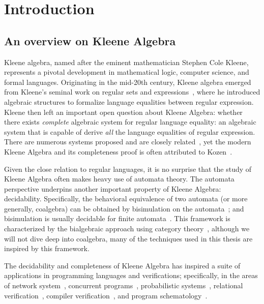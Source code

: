 \chapter{Introduction}
\label{chapter:introduction}
\thispagestyle{myheadings}

\section{An overview on Kleene Algebra}
\label{sec:history}

Kleene algebra, named after the eminent mathematician Stephen Cole Kleene, represents a pivotal development in mathematical logic, computer science, and formal languages. 
Originating in the mid-20th century, Kleene algebra emerged from Kleene's seminal work on regular sets and expressions~\cite{Kleene_1956}, where he introduced algebraic structures to formalize language equalities between regular expression. 
Kleene then left an important open question about Kleene Algebra: whether there exists \emph{complete} algebraic system for regular language equality: an algebraic system that is capable of derive \emph{all} the language equalities of regular expression.
There are numerous systems proposed and are closely related~\cite{Kozen_1990}, yet the modern Kleene Algebra and its completeness proof is often attributed to Kozen~\cite{Kozen_2001,Kozen_1994}.

Given the close relation to regular languages, it is no surprise that the study of Kleene Algebra often makes heavy use of automata theory.
The automata perspective underpins another important property of Kleene Algebra: decidability.
Specifically, the behavioral equivalence of two automata (or more generally, coalgebra) can be obtained by bisimulation on the automata~\cite{rutten_UniversalCoalgebraTheory_2000}; and bisimulation is usually decidable for finite automata~\cite{Kozen_2008,Smolka_Foster_Hsu_Kappé_Kozen_Silva_2020,Silva_2010}.
This framework is characterized by the bialgebraic approach using category theory~\cite{jacobs_BialgebraicReviewDeterministic_2006}, although we will not dive deep into coalgebra, many of the techniques used in this thesis are inspired by this framework.

The decidability and completeness of Kleene Algebra has inspired a suite of applications in programming languages and verifications; specifically, in the areas of network system~\cite{Anderson_Foster_Guha_Jeannin_Kozen_Schlesinger_Walker_2014,Foster_Kozen_Milano_Silva_Thompson_2015, Smolka_Kumar_Kahn_Foster_Hsu_Kozen_Silva_2019},
concurrent programs~\cite{hoare_ConcurrentKleeneAlgebra_2009,Kappé_Brunet_Silva_Wagemaker_Zanasi_2020,Kappé_Brunet_Silva_Zanasi_2018}, 
probabilistic systems~\cite{mciver_UsingProbabilisticKleene_2006, McIver_Rabehaja_Struth_2011}, 
relational verification~\cite{Antonopoulos_Koskinen_Le_Nagasamudram_Naumann_Ngo_2022},
compiler verification~\cite{Kozen_Patron_2000},
and program schematology~\cite{Angus_Kozen_2001}.

